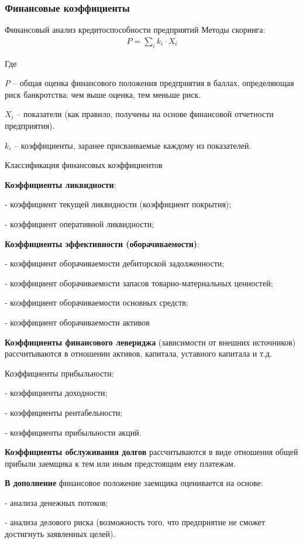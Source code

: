 \documentclass[_Banking_p2.tex]{subfiles}
\begin{document}
\subsubsection{Финансовые коэффициенты}
\begin{frame}{Финансовый анализ кредитоспособности предприятий}{}
Методы скоринга:
\begin{align}
P=\sum_i{k_i\cdot X_i}
\end{align}

Где

\textit{P} – общая оценка финансового положения предприятия в баллах, определяющая риск банкротства; чем выше оценка, тем меньше риск.

$X_i$ – показатели (как правило, получены на основе финансовой отчетности предприятия).

$k_i$ – коэффициенты, заранее присваиваемые каждому из показателей.
\end{frame}

\begin{frame}[ allowframebreaks ]{Классификация финансовых коэффициентов}

\textbf{Коэффициенты ликвидности}:

- коэффициент текущей ликвидности (коэффициент покрытия);

- коэффициент оперативной ликвидности;

\bigskip
\textbf{Коэффициенты эффективности (оборачиваемости)}:

- коэффициент оборачиваемости дебиторской задолженности;

- коэффициент оборачиваемости запасов товарно-материальных ценностей;

- коэффициент оборачиваемости основных средств;

- коэффициент оборачиваемости активов

\pagebreak
\textbf{Коэффициенты финансового левериджа }(зависимости от внешних источников) рассчитываются в отношении активов, капитала, уставного капитала и т.д.

\bigskip
Коэффициенты прибыльности:

- коэффициенты доходности;

- коэффициенты рентабельности;

- коэффициенты прибыльности акций.

\bigskip
\textbf{Коэффициенты обслуживания долгов} рассчитываются в виде отношения общей прибыли заемщика к тем или иным предстоящим ему платежам.

\pagebreak
\textbf{В дополнение }финансовое положение заемщика оценивается на основе:

- анализа денежных потоков;

- анализа делового риска (возможность того, что предприятие не сможет достигнуть заявленных целей).


\end{frame}
\end{document}

